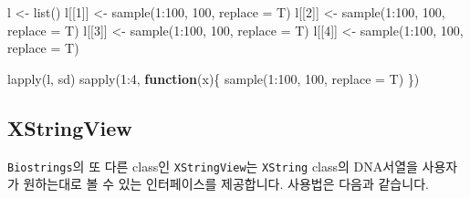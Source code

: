 \documentclass[
]{book}
\newenvironment{Shaded}{\begin{snugshade}}{\end{snugshade}}
\newcommand{\AttributeTok}[1]{\textcolor[rgb]{0.77,0.63,0.00}{#1}}
\newcommand{\ControlFlowTok}[1]{\textcolor[rgb]{0.13,0.29,0.53}{\textbf{#1}}}
\newcommand{\DecValTok}[1]{\textcolor[rgb]{0.00,0.00,0.81}{#1}}
\newcommand{\FunctionTok}[1]{\textcolor[rgb]{0.00,0.00,0.00}{#1}}
\newcommand{\NormalTok}[1]{#1}
\newcommand{\OtherTok}[1]{\textcolor[rgb]{0.56,0.35,0.01}{#1}}
\newcommand{\SpecialCharTok}[1]{\textcolor[rgb]{0.00,0.00,0.00}{#1}}
\begin{document}
\begin{Shaded}
\begin{Highlighting}[]
\NormalTok{l }\OtherTok{\textless{}{-}} \FunctionTok{list}\NormalTok{()}
\NormalTok{l[[}\DecValTok{1}\NormalTok{]] }\OtherTok{\textless{}{-}} \FunctionTok{sample}\NormalTok{(}\DecValTok{1}\SpecialCharTok{:}\DecValTok{100}\NormalTok{, }\DecValTok{100}\NormalTok{, }\AttributeTok{replace =}\NormalTok{ T)}
\NormalTok{l[[}\DecValTok{2}\NormalTok{]] }\OtherTok{\textless{}{-}} \FunctionTok{sample}\NormalTok{(}\DecValTok{1}\SpecialCharTok{:}\DecValTok{100}\NormalTok{, }\DecValTok{100}\NormalTok{, }\AttributeTok{replace =}\NormalTok{ T)}
\NormalTok{l[[}\DecValTok{3}\NormalTok{]] }\OtherTok{\textless{}{-}} \FunctionTok{sample}\NormalTok{(}\DecValTok{1}\SpecialCharTok{:}\DecValTok{100}\NormalTok{, }\DecValTok{100}\NormalTok{, }\AttributeTok{replace =}\NormalTok{ T)}
\NormalTok{l[[}\DecValTok{4}\NormalTok{]] }\OtherTok{\textless{}{-}} \FunctionTok{sample}\NormalTok{(}\DecValTok{1}\SpecialCharTok{:}\DecValTok{100}\NormalTok{, }\DecValTok{100}\NormalTok{, }\AttributeTok{replace =}\NormalTok{ T)}

\FunctionTok{lapply}\NormalTok{(l, sd)}
\FunctionTok{sapply}\NormalTok{(}\DecValTok{1}\SpecialCharTok{:}\DecValTok{4}\NormalTok{, }\ControlFlowTok{function}\NormalTok{(x)\{}
  \FunctionTok{sample}\NormalTok{(}\DecValTok{1}\SpecialCharTok{:}\DecValTok{100}\NormalTok{, }\DecValTok{100}\NormalTok{, }\AttributeTok{replace =}\NormalTok{ T)}
\NormalTok{  \})}
\end{Highlighting}
\end{Shaded}

\hypertarget{xstringview}{%
\subsection{XStringView}\label{xstringview}}

\texttt{Biostrings}의 또 다른 class인 \texttt{XStringView}는 \texttt{XString} class의 DNA서열을 사용자가 원하는대로 볼 수 있는 인터페이스를 제공합니다. 사용법은 다음과 같습니다.
\end{document}
